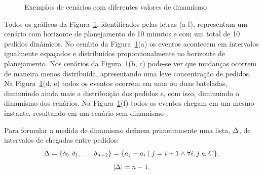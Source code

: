 \begin{figure}[H]
    \begin{center}
        \caption{Exemplos de cenários com diferentes valores de dinamismo 
        \cite{van_lon_measures_2016}}
        \label{fig:van_lon_measures_2016_dynamism}
    \end{center} 
\end{figure}

Todos os gráficos da Figura~\ref{fig:van_lon_measures_2016_dynamism},
identificados pelas letras (a-f), representam um cenário com horizonte de 
planejamento de 10 minutos e com um total de 10 pedidos dinâmicos.
No cenário da Figura~\ref{fig:van_lon_measures_2016_dynamism}(a) os eventos 
acontecem em intervalos igualmente espaçados e distribuídos proporcionalmente 
no horizonte de planejamento.
Nos cenários da Figura~\ref{fig:van_lon_measures_2016_dynamism}(b, c) 
pode-se ver que mudanças ocorrem de maneira menos distribuída, apresentando uma
leve concentração de pedidos.
Na Figura~\ref{fig:van_lon_measures_2016_dynamism}(d, e) todos os eventos
ocorrem em uma ou duas bateladas, diminuindo ainda mais a distribuição dos
pedidos e, com isso, diminuindo o dinamismo dos cenários.
Na Figura~\ref{fig:van_lon_measures_2016_dynamism}(f) todos os eventos chegam
em um mesmo instante, resultando em um cenário sem dinamismo
\cite{van_lon_measures_2016}.

Para formular a medida de dinamismo  definem
primeiramente uma lista, $\Delta$, de intervalos de chegadas
entre pedidos:
%
\begin{equation}
    \Delta = 
    \{\delta_0,\delta_1,\ldots, 
    \delta_{n-2}\} = 
    \{a_j - a_i 
    \mid j = i + 1 \wedge \forall i, j \in C\},
    \label{eq:van_lon_measures_2016_intervalsBetweenArrivals}
\end{equation}
%
\begin{equation}
    |\Delta| = n - 1.
    \label{eq:van_lon_measures_2016_intervalsBetweenArrivalsSize}
\end{equation}

